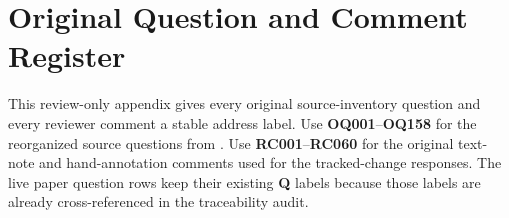 \ifreviewchanges
\clearpage
\chapter*{Original Question and Comment Register}
\footnotesize
\renewcommand{\arraystretch}{1.12}
This review-only appendix gives every original source-inventory question and every reviewer comment a stable address label.  Use \textbf{OQ001}--\textbf{OQ158} for the reorganized source questions from .  Use \textbf{RC001}--\textbf{RC060} for the original text-note and hand-annotation comments used for the tracked-change responses.  The live paper question rows keep their existing \textbf{Q} labels because those labels are already cross-referenced in the traceability audit.\par\medskip
